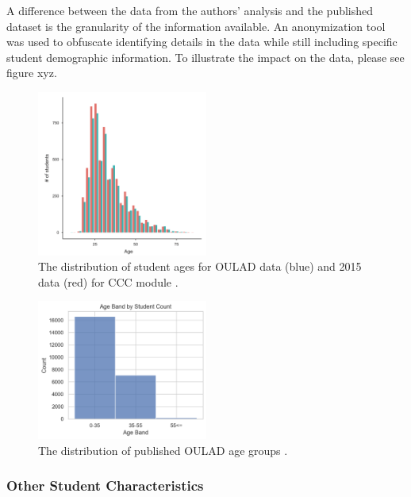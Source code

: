 \documentclass{article}
\begin{document}
            A difference between the data from the authors' analysis and the published dataset is the granularity of the information available.
            An anonymization tool was used to obfuscate identifying details in the data while still including specific student demographic information. 
            To illustrate the impact on the data, please see figure xyz.
            \begin{figure}
                \centering
                \includegraphics[width=0.5\textwidth]{oulad_15_age}
                \caption{The distribution of student ages for OULAD data (blue) and 2015 data (red) for CCC module \cite{oulad}.}
                \label{fig:oulad_15_age}
            \end{figure}
            \begin{figure}
                \centering
                \includegraphics[width=0.5\textwidth]{age_band_by_student}
                \caption{The distribution of published OULAD age groups \cite{oulad}.}
                \label{fig:age_band_by_student}
            \end{figure}
            
            
            \subsubsection{Other Student Characteristics}
            
\end{document}
